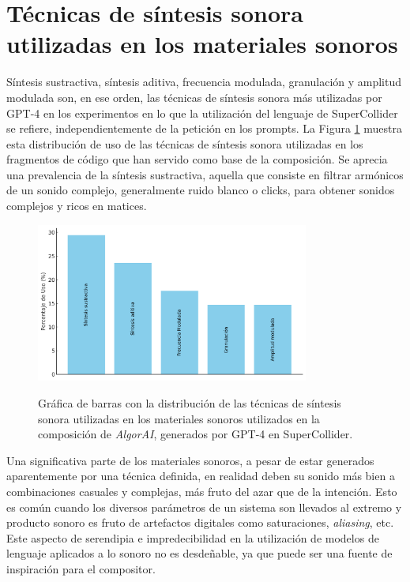 \section{Técnicas de síntesis sonora utilizadas en los materiales sonoros}

Síntesis sustractiva, síntesis aditiva, frecuencia modulada, granulación y amplitud modulada son, en ese orden, las técnicas de síntesis sonora más utilizadas por GPT-4 en los experimentos en lo que la utilización del lenguaje de SuperCollider se refiere, independientemente de la petición en los prompts. La Figura \ref{fig:grafica_sintesis_gpt4} muestra esta distribución de uso de las técnicas de síntesis sonora utilizadas en los fragmentos de código que han servido como base de la composición. Se aprecia una prevalencia de la síntesis sustractiva, aquella que consiste en filtrar armónicos de un sonido complejo, generalmente ruido blanco o clicks, para obtener sonidos complejos y ricos en matices.

\begin{figure}[H]
    \caption[Gráfica de barras con la distribución de las técnicas de síntesis sonora utilizadas en los materiales sonoros generados por GPT-4 en SuperCollider]{Gráfica de barras con la distribución de las técnicas de síntesis sonora utilizadas en los materiales sonoros utilizados en la composición de \textit{AlgorAI}, generados por GPT-4 en SuperCollider.}
    \centering
    \includegraphics[width=0.8\textwidth]{./figuras/grafica_sintesis_gpt4.png}
    \label{fig:grafica_sintesis_gpt4}
\end{figure}

Una significativa parte de los materiales sonoros, a pesar de estar generados aparentemente por una técnica definida, en realidad deben su sonido más bien a combinaciones casuales y complejas, más fruto del azar que de la intención. Esto es común cuando los diversos parámetros de un sistema son llevados al extremo y producto sonoro es fruto de artefactos digitales como saturaciones, \textit{aliasing}, etc. Este aspecto de serendipia e impredecibilidad en la utilización de modelos de lenguaje aplicados a lo sonoro no es desdeñable, ya que puede ser una fuente de inspiración para el compositor.

